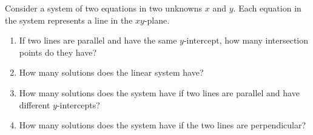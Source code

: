 \documentclass{ximera}
\author{Parisa Fatheddin}
\begin{document}
\begin{exercise}
  Consider a system of two equations in two unknowns $x$ and $y$. Each
  equation in the system represents a line in the $xy$-plane.
  \begin{enumerate}
  \item If two lines are parallel and have the same $y$-intercept, how
    many intersection points do they have?
    \begin{prompt}
      \begin{multipleChoice}
      \end{multipleChoice}
    \end{prompt}
  \item How many solutions does the linear system have?
    \begin{prompt}
      \begin{multipleChoice}
      \end{multipleChoice}
    \end{prompt}
  \item How many solutions does the system have if two lines are
    parallel and have different $y$-intercepts?
    \begin{prompt}
      \begin{multipleChoice}
      \end{multipleChoice}
    \end{prompt}
  \item How many solutions does the system have if the two lines are
    perpendicular?
    \begin{prompt}
      \begin{multipleChoice}
      \end{multipleChoice}
    \end{prompt}
  \end{enumerate}
\end{exercise}
\end{document}
